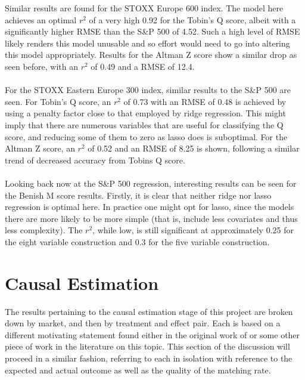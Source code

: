 Similar results are found for the STOXX Europe 600 index. The model here achieves an optimal $r^2$ of a very high 0.92 for the Tobin's Q score, albeit with a significantly higher RMSE than the S\&P 500 of 4.52. Such a high level of RMSE likely renders this model unusable and so effort would need to go into altering this model appropriately. Results for the Altman Z score show a similar drop as seen before, with an $r^2$ of 0.49 and a RMSE of 12.4.\\\\
For the STOXX Eastern Europe 300 index, similar results to the S\&P 500 are seen. For Tobin's Q score, an $r^2$ of 0.73 with an RMSE of 0.48 is achieved by using a penalty factor close to that employed by ridge regression. This might imply that there are numerous variables that are useful for classifying the Q score, and reducing some of them to zero as lasso does is suboptimal. For the Altman Z score, an $r^2$ of 0.52 and an RMSE of 8.25 is shown, following a similar trend of decreased accuracy from Tobins Q score.\\\\
Looking back now at the S\&P 500 regression, interesting results can be seen for the Benish M score results. Firstly, it is clear that neither ridge nor lasso regression is optimal here. In practice one might opt for lasso, since the models there are more likely to be more simple (that is, include less covariates and thus less complexity). The $r^2$, while low, is still significant at approximately 0.25 for the eight variable construction and 0.3 for the five variable construction. 
\section{Causal Estimation}\label{S.Discussion.causal}
The results pertaining to the causal estimation stage of this project are broken down by market, and then by treatment and effect pair. Each is based on a different motivating statement found either in the original work of \cite{moldovan2015learning} or some other piece of work in the literature on this topic. This section of the discussion will proceed in a similar fashion, referring to each in isolation with reference to the expected and actual outcome as well as the quality of the matching rate. 
